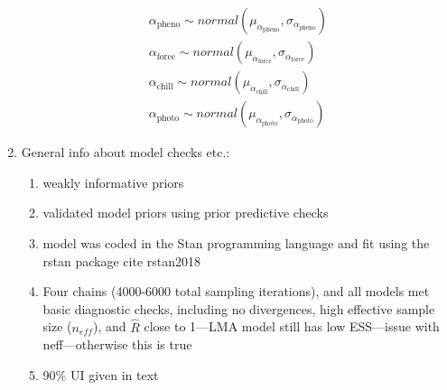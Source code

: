 \documentclass{article}
\begin{document}
\begin{enumerate}
\begin{align}
\alpha_{\text{pheno}} \sim normal(\mu_{\alpha_{\text{pheno}}},\sigma_{\alpha_{\text{pheno}}}) \\
\alpha_{\text{force}} \sim normal(\mu_{\alpha_{\text{force}}},\sigma_{\alpha_{\text{force}}}) \nonumber \\
\alpha_{\text{chill}} \sim normal(\mu_{\alpha_{\text{chill}}},\sigma_{\alpha_{\text{chill}}}) \nonumber \\
\alpha_{\text{photo}} \sim normal(\mu_{\alpha_{\text{photo}}},\sigma_{\alpha_{\text{photo}}}) \nonumber
\end{align}

\item General info about model checks etc.:
\begin{enumerate}
\item weakly informative priors
\item validated model priors using prior predictive checks
\item model was coded in the Stan programming language and fit using the rstan package cite rstan2018
\item Four chains (4000-6000 total sampling iterations), and all models met basic diagnostic checks, including no divergences, high effective sample size (\emph{$n_{eff}$}), and $\hat{R}$ close to 1---LMA model still has low ESS---issue with neff---otherwise this is true
\item 90\% UI given in text

\end{enumerate} 

\end{enumerate} 
\end{document}
